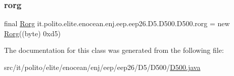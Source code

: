 \subsubsection{\texorpdfstring{rorg}{rorg}}
{\footnotesize\ttfamily final \hyperlink{classit_1_1polito_1_1elite_1_1enocean_1_1enj_1_1eep_1_1_rorg}{Rorg} it.\+polito.\+elite.\+enocean.\+enj.\+eep.\+eep26.\+D5.\+D500.\+D500.\+rorg = new \hyperlink{classit_1_1polito_1_1elite_1_1enocean_1_1enj_1_1eep_1_1_rorg}{Rorg}((byte) 0xd5)\hspace{0.3cm}{\ttfamily [static]}}



The documentation for this class was generated from the following file\+:\begin{DoxyCompactItemize}
\item 
src/it/polito/elite/enocean/enj/eep/eep26/\+D5/\+D500/\hyperlink{_d500_8java}{D500.\+java}\end{DoxyCompactItemize}
